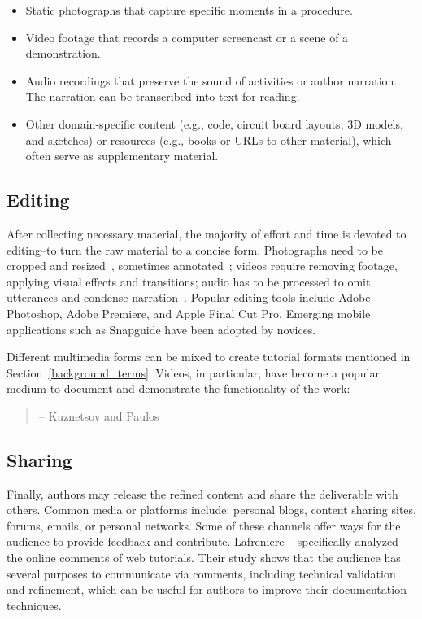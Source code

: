\begin{itemize}
  \item Static photographs that capture specific moments in a procedure.
  \item Video footage that records a computer screencast or a scene of a demonstration.
  \item Audio recordings that preserve the sound of activities or author narration. The narration can be transcribed into text for reading.
  \item Other domain-specific content (e.g., code, circuit board layouts, 3D models, and sketches) or resources (e.g., books or URLs to other material), which often serve as supplementary material.
\end{itemize}

\subsection{Editing}
After collecting necessary material, the majority of effort and time is devoted to editing--to turn the raw material to a concise form.
Photographs need to be cropped and resized~\cite{Tseng:2014:PVP:2598510.2598540}, sometimes annotated~\cite{Torrey:2007he}; videos require removing footage, applying visual effects and transitions; audio has to be processed to omit utterances and condense narration~\cite{Chi:2013:DGC:2501988.2502052}. Popular editing tools include Adobe Photoshop, Adobe Premiere, and Apple Final Cut Pro. Emerging mobile applications such as Snapguide have been adopted by novices.

Different multimedia forms can be mixed to create tutorial formats mentioned in Section~\ref{background_terms}. Videos, in particular, have become a popular medium to document and demonstrate the functionality of the work:

\begin{quote}
 -- Kuznetsov and Paulos~\cite{Kuznetsov:2010:REA:1868914.1868950}
\end{quote}

\subsection{Sharing}
Finally, authors may release the refined content and share the deliverable with others. Common media or platforms include: personal blogs, content sharing sites, forums, emails, or personal networks.
%
Some of these channels offer ways for the audience to provide feedback and contribute. Lafreniere \ea{}~\cite{Lafreniere:2012tl} specifically analyzed the online comments of web tutorials. Their study shows that the audience has several purposes to communicate via comments, including technical validation and refinement, which can be useful for authors to improve their documentation techniques.

